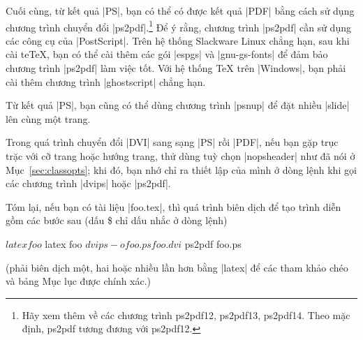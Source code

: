 Cuối cùng, từ kết quả |PS|, bạn có thể có được kết quả |PDF| bằng cách
sử dụng chương trình chuyển đổi |ps2pdf|.\footnote{Hãy xem thêm về các chương
trình ps2pdf12, ps2pdf13, ps2pdf14. Theo mặc định, ps2pdf tương đương với ps2pdf12.}
Để ý rằng, chương trình |ps2pdf| cần sử dụng các công cụ của |PostScript|.
Trên hệ thống Slackware Linux chẳng hạn, sau khi cài te\TeX{},
bạn có thể cài thêm các gói |espgs| và |gnu-gs-fonts|
để đảm bảo chương trình |ps2pdf| làm việc tốt. Với hệ thống \TeX{} trên |Windows|,
bạn phải cài thêm chương trình |ghostscript| chẳng hạn.

Từ kết quả |PS|, bạn cũng có thể dùng chương trình |psnup|
để đặt nhiều |slide| lên cùng một trang.

Trong quá trình chuyển đổi |DVI| sang sạng |PS| rồi |PDF|,
nếu bạn gặp trục trặc với cỡ trang hoặc hướng trang,
thử dùng tuỳ chọn |nopsheader| như đã nói ở Mục~\vref{sec:classopts};
khi đó, bạn nhớ chỉ ra thiết lập của mình ở dòng lệnh khi gọi các chương trình
|dvips| hoặc |ps2pdf|.


Tóm lại, nếu bạn có tài liệu |foo.tex|, thì quá trình biên dịch
để tạo trình diễn gồm các bước sau (dấu \$ chỉ dấu nhắc ở dòng lệnh)
\begin{command}
  $ latex foo
  $ latex foo
  $ dvips -o foo.ps foo.dvi
  $ ps2pdf foo.ps
\end{command}
(phải biên dịch một, hai hoặc nhiều lần hơn bằng |latex| để các tham khảo chéo
và bảng Mục lục được chính xác.)

\endinput
